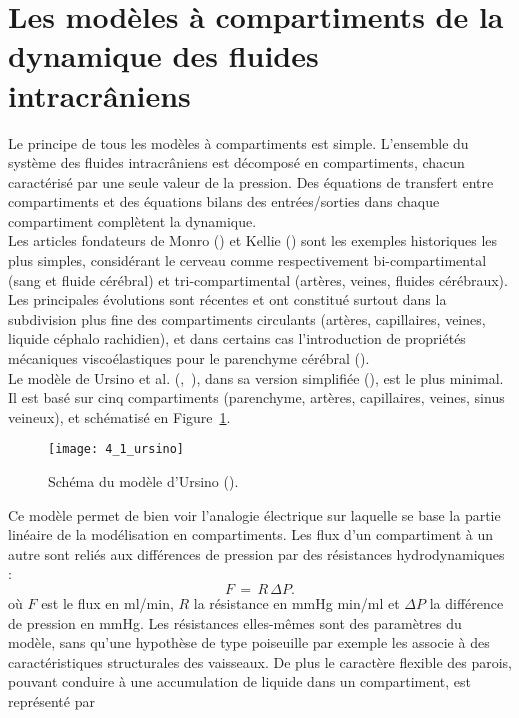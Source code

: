 \section{Les modèles à compartiments de la dynamique des fluides intracrâniens}
\label{sec:modeles_compartiments}
Le principe de tous les modèles à compartiments est simple. L'ensemble du système des fluides
intracrâniens est décomposé en compartiments, chacun caractérisé par une seule valeur de la
pression. Des équations de transfert entre compartiments et des équations bilans des entrées/sorties
dans chaque compartiment complètent la dynamique.\\
Les articles fondateurs de Monro  (\cite{Monro2010}) et Kellie (\cite{Kellie1824}) sont les exemples historiques les plus
simples, considérant le cerveau comme respectivement bi-compartimental (sang et fluide cérébral) et
tri-compartimental (artères, veines, fluides cérébraux). Les principales évolutions sont récentes et ont
constitué surtout dans la subdivision plus fine des compartiments circulants (artères, capillaires,
veines, liquide céphalo rachidien), et dans certains cas l'introduction de propriétés mécaniques
viscoélastiques pour le parenchyme cérébral (\cite{Sorek1988}).\\
Le modèle de Ursino et al. (\cite{Ursino1988},~\cite{Ursino1991}), dans sa version simplifiée (\cite{Ursino1997}), est le plus minimal. Il est
basé sur cinq compartiments (parenchyme, artères, capillaires, veines, sinus veineux), et schématisé
en Figure~\ref{fig:4_1_ursino}. 
\begin{figure}[!t]
\centering
\texttt{[image: 4\_1\_ursino]}
\caption{Schéma du modèle d'Ursino (\cite{Ursino1997}).}
\label{fig:4_1_ursino}	
\end{figure}
Ce modèle permet de bien voir l'analogie électrique sur laquelle se base la partie linéaire de la
modélisation en compartiments. Les flux d'un compartiment à un autre sont reliés aux différences de
pression par des résistances hydrodynamiques :
\begin{equation}
F\,=\,R\,\Delta P.
\end{equation}
où $F$ est le flux en ml/min, $R$ la résistance en mmHg min/ml et $\Delta P$ la différence de pression en mmHg.
Les résistances elles-mêmes sont des paramètres du modèle, sans qu'une hypothèse de type poiseuille
par exemple les associe à des caractéristiques structurales des vaisseaux. De plus le caractère flexible
des parois, pouvant conduire à une accumulation de liquide dans un compartiment, est représenté par
